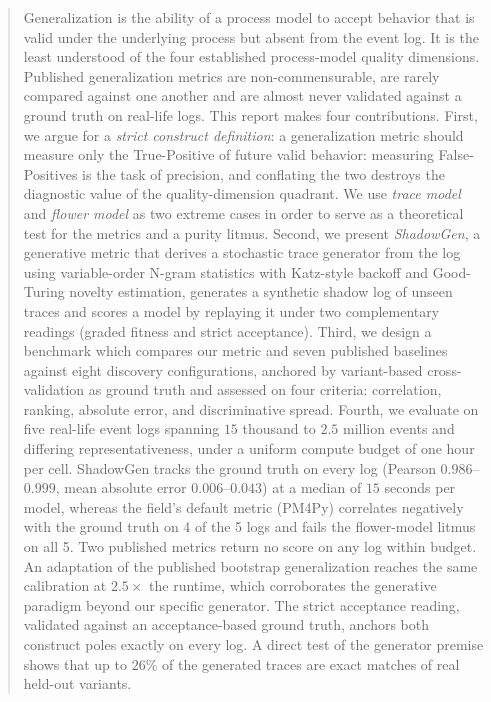 \documentclass[runningheads]{llncs}
\newcommand{\chg}[1]{\textcolor{chgblue}{#1}}
\begin{document}
\begin{abstract}
Generalization is the ability of a process model to accept behavior that is valid under the underlying process but absent from the event log. It is the least understood of the four established process-model quality dimensions. Published generalization metrics are non-commensurable, are rarely compared against one another and are almost never validated against a ground truth on real-life logs. This report makes four contributions. First, we argue for a \emph{strict construct definition}: a generalization metric should measure only the True-Positive of future valid behavior: measuring False-Positives is the task of precision, and conflating the two destroys the diagnostic value of the quality-dimension quadrant. We use \emph{trace model} and \emph{flower model} as two extreme cases in order to serve as a theoretical test for the metrics and a purity litmus. Second, we present \emph{ShadowGen}, a generative metric that derives a stochastic trace generator from the log using variable-order N-gram statistics with Katz-style backoff and Good-Turing novelty estimation, generates a synthetic shadow log of unseen traces and scores a model by replaying it under two complementary readings (graded fitness and strict acceptance). Third, we design a benchmark which compares our metric and seven published baselines against eight discovery configurations, anchored by variant-based cross-validation as ground truth and assessed on four criteria: correlation, ranking, absolute error, and discriminative spread. \chg{Fourth, we evaluate on five real-life event logs spanning $15$ thousand to $2.5$ million events and differing representativeness, under a uniform compute budget of one hour per cell. ShadowGen tracks the ground truth on every log (Pearson $0.986$--$0.999$, mean absolute error $0.006$--$0.043$) at a median of $15$ seconds per model, whereas the field's default metric (PM4Py) correlates negatively with the ground truth on 4 of the 5 logs and fails the flower-model litmus on all 5. Two published metrics return no score on any log within budget. An adaptation of the published bootstrap generalization reaches the same calibration at $2.5\times$ the runtime, which corroborates the generative paradigm beyond our specific generator. The strict acceptance reading, validated against an acceptance-based ground truth, anchors both construct poles exactly on every log. A direct test of the generator premise shows that up to $26\%$ of the generated traces are exact matches of real held-out variants.}

\end{abstract}
\end{document}
